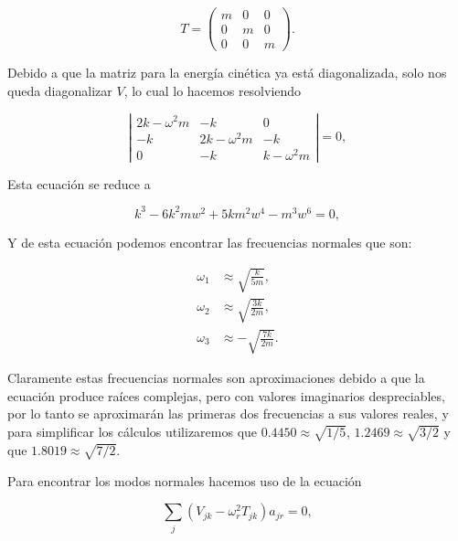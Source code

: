 \documentclass[a4paper,10pt]{article}
\numberwithin{equation}{section}
\begin{document}
\begin{equation}
 T = \begin{pmatrix}
      m & 0 & 0 \\
      0 & m & 0 \\
      0 & 0 & m
     \end{pmatrix}.
\end{equation}

Debido a que la matriz para la energía cinética ya está diagonalizada, solo nos queda 
diagonalizar $V$, lo cual lo hacemos resolviendo

\begin{equation}
 \left| \begin{matrix}
	    2k - \omega^2 m & -k & 0 \\
	    -k & 2k - \omega^2 m & -k \\
	    0 & -k & k - \omega^2 m
     \end{matrix}\right| = 0,
\end{equation}

Esta ecuación se reduce a 

\begin{equation}
 k^{3} - 6 k^{2} m w^{2} + 5 k m^{2} w^{4} - m^{3} w^{6} = 0,
 \label{eq:complex}
\end{equation}

Y de esta ecuación podemos encontrar las frecuencias normales que son:

\begin{align}
 \omega_1 &\approx \sqrt{\frac{k}{5m}}, \\
 \omega_2 &\approx \sqrt{\frac{3k}{2m}}, \\
 \omega_3 &\approx - \sqrt{\frac{7k}{2m}}.
\end{align}

Claramente estas frecuencias normales son aproximaciones debido a que la ecuación 
 produce raíces complejas, pero con valores imaginarios despreciables, 
por lo tanto se aproximarán las primeras dos frecuencias a sus valores reales, 
y para simplificar los cálculos utilizaremos que $0.4450 \approx \sqrt{1/5}$, 
$1.2469 \approx \sqrt{3/2}$ y que $1.8019 \approx \sqrt{7/2}$.

\vspace{.3cm}

Para encontrar los modos normales hacemos uso de la ecuación

\begin{equation}
 \sum_j (V_{jk} - \omega^2_r T_{jk})a_{jr} = 0,
\end{equation}
\end{document}
